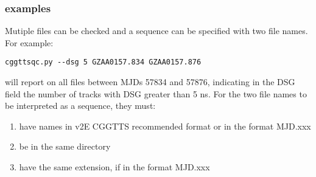 \subsubsection{examples}

Mutiple files can be checked and a sequence can be specified with two file names.
For example:
\begin{lstlisting}
cggttsqc.py --dsg 5 GZAA0157.834 GZAA0157.876
\end{lstlisting}
will report on all files between MJDs 57834 and 57876, indicating in the DSG field the number of tracks with DSG greater
than 5 ns. For the two file names to be interpreted as a sequence, they must:
\begin{enumerate}
	\item have names in v2E CGGTTS recommended format or in the format MJD.xxx
	\item be in the same directory
	\item have the same extension, if in the format MJD.xxx
\end{enumerate}
